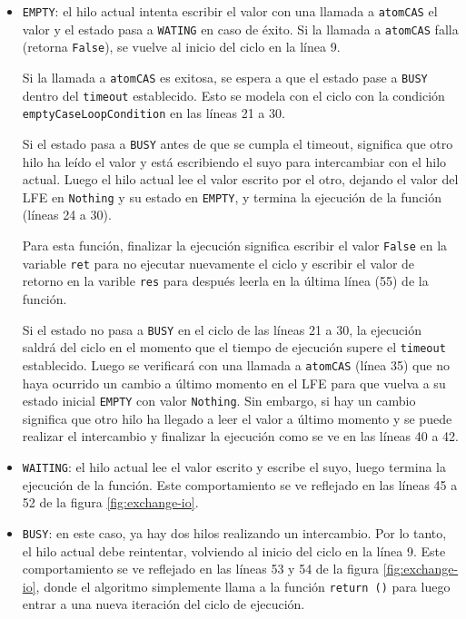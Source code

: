 \begin{itemize}
\item{
\texttt{EMPTY}: el hilo actual intenta escribir el valor con una llamada a \texttt{atomCAS} el valor y el estado pasa a \texttt{WATING} en caso de éxito. Si la llamada a \texttt{atomCAS} falla (retorna \texttt{False}), se vuelve al inicio del ciclo en la línea 9.

Si la llamada a \texttt{atomCAS} es exitosa, se espera a que el estado pase a \texttt{BUSY} dentro del \texttt{timeout} establecido. Esto se modela con el ciclo con la condición \texttt{emptyCaseLoopCondition} en las líneas 21 a 30.

Si el estado pasa a \texttt{BUSY} antes de que se cumpla el timeout, significa que otro hilo ha leído el valor y está escribiendo el suyo para intercambiar con el hilo actual. Luego el hilo actual lee el valor escrito por el otro, dejando el valor del LFE en \texttt{Nothing} y su estado en \texttt{EMPTY}, y termina la ejecución de la función (líneas 24 a 30).} Para esta función, finalizar la ejecución significa escribir el valor \texttt{False} en la variable \texttt{ret} para no ejecutar nuevamente el ciclo y escribir el valor de retorno en la varible \texttt{res} para después leerla en la última línea (55) de la función.

Si el estado no pasa a \texttt{BUSY} en el ciclo de las líneas 21 a 30, la ejecución saldrá del ciclo en el momento que el tiempo de ejecución supere el \texttt{timeout} establecido. Luego se verificará con una llamada a \texttt{atomCAS} (línea 35) que no haya ocurrido un cambio a último momento en el LFE para que vuelva a su estado inicial \texttt{EMPTY} con valor \texttt{Nothing}. Sin embargo, si hay un cambio significa que otro hilo ha llegado a leer el valor a último momento y se puede realizar el intercambio y finalizar la ejecución como se ve en las líneas 40 a 42.


\item{\texttt{WAITING}: el hilo actual lee el valor escrito y escribe el suyo, luego termina la ejecución de la función. Este comportamiento se ve reflejado en las líneas 45 a 52 de la figura \ref{fig:exchange-io}.}
\item{\texttt{BUSY}: en este caso, ya hay dos hilos realizando un intercambio. Por lo tanto, el hilo actual debe reintentar, volviendo al inicio del ciclo en la línea 9. Este comportamiento se ve reflejado en las líneas 53 y 54 de la figura \ref{fig:exchange-io}, donde el algoritmo simplemente llama a la función \texttt{return ()} para luego entrar a una nueva iteración del ciclo de ejecución.}
\end{itemize}
\newpage

